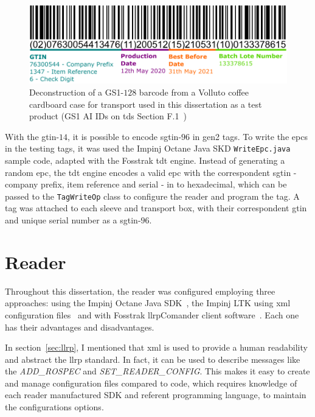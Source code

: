 \begin{figure}
    \centering
    \includegraphics[width=\textwidth]{figs/gs1-128barcode.pdf}
    \caption{Deconstruction of a GS1-$128$ barcode from a Volluto coffee cardboard case for transport used in this dissertation as a test product (GS1 AI IDs on \acs{tds} Section F.1~\cite{EPCTagData})}
    \label{fig:gs1-128barcode}
\end{figure}

With the \acs{gtin}-$14$, it is possible to encode \ac{sgtin}-$96$ in \ac{gen2} tags. To write the \acp{epc} in the testing tags, it was used the Impinj Octane Java SKD \texttt{WriteEpc.java} sample code, adapted with the Fosstrak \ac{tdt} engine. Instead of generating a random \ac{epc}, the \ac{tdt} engine encodes a valid \ac{epc} with the correspondent \ac{sgtin} - company prefix, item reference and serial - in to hexadecimal, which can be passed to the \texttt{TagWriteOp} class to configure the reader and program the tag.
A tag was attached to each sleeve and transport box, with their correspondent \ac{gtin} and unique serial number as a \ac{sgtin}-$96$.

\section{Reader} \label{sec:readerconfiguration}

Throughout this dissertation, the reader was configured employing three approaches: using the Impinj Octane Java SDK~\cite{OctaneSDK}, the Impinj LTK using \ac{xml} configuration files~\cite{LTKXMLJava} and with Fosstrak \ac{llrp}Comander client software~\cite{FosstrakLLRPCommander}.
Each one has their advantages and disadvantages.

In section~\ref{sec:llrp}, I mentioned that \ac{xml} is used to provide a human readability and abstract the \ac{llrp} standard.
In fact, it can be used to describe messages like the \textit{ADD\_ROSPEC} and \textit{SET\_READER\_CONFIG}.
This makes it easy to create and manage configuration files compared to code, which requires knowledge of each reader manufactured SDK and referent programming language, to maintain the configurations options.

